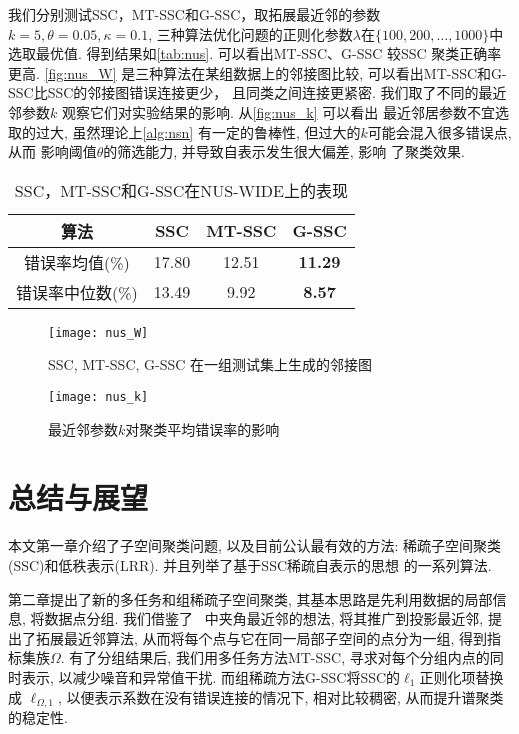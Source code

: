 我们分别测试SSC，MT-SSC和G-SSC，取拓展最近邻的参数
\(k=5,\theta=0.05, \kappa=0.1\),
三种算法优化问题的正则化参数\(\lambda\)在\(\{100, 200, \ldots, 1000\}\)中选取最优值.
得到结果如\autoref{tab:nus}.
可以看出MT-SSC、G-SSC 较SSC 聚类正确率更高.
\autoref{fig:nus_W} 是三种算法在某组数据上的邻接图比较,
可以看出MT-SSC和G-SSC比SSC的邻接图错误连接更少，
且同类之间连接更紧密. 我们取了不同的最近邻参数\(k\)
观察它们对实验结果的影响. 从\autoref{fig:nus_k} 可以看出
最近邻居参数不宜选取的过大, 虽然理论上\autoref{alg:nsn}
有一定的鲁棒性, 但过大的\(k\)可能会混入很多错误点, 从而
影响阈值\(\theta\)的筛选能力, 并导致自表示发生很大偏差, 影响
了聚类效果.
\begin{table}[htb]
  \centering
  \begin{tabular}{|c | c | c | c |}
	\hline
	  算法 & SSC & MT-SSC & G-SSC \\	\hline  \hline
      错误率均值(\%) & 17.80 & 12.51 & \textbf{11.29} \\	\hline
      错误率中位数(\%) & 13.49 & 9.92 & \textbf{8.57} \\	\hline
  \end{tabular}
  \caption{SSC，MT-SSC和G-SSC在NUS-WIDE上的表现}
  \label{tab:nus}
\end{table}

\begin{figure}[htb]
  \centering
  \texttt{[image: nus\_W]}
  \caption{SSC, MT-SSC, G-SSC 在一组测试集上生成的邻接图}
  \label{fig:nus_W}
\end{figure}
\begin{figure}[htb]
  \centering
  \texttt{[image: nus\_k]}
  \caption{最近邻参数\(k\)对聚类平均错误率的影响}
  \label{fig:nus_k}
\end{figure}

\section{总结与展望}
本文第一章介绍了子空间聚类问题, 以及目前公认最有效的方法:
稀疏子空间聚类(SSC)和低秩表示(LRR). 并且列举了基于SSC稀疏自表示的思想
的一系列算法.

第二章提出了新的多任务和组稀疏子空间聚类,
其基本思路是先利用数据的局部信息, 将数据点分组. 我们借鉴了~\cite{heckel2013noisy}
中夹角最近邻的想法, 将其推广到投影最近邻, 提出了拓展最近邻算法,
从而将每个点与它在同一局部子空间的点分为一组, 得到指标集族\(\Omega\).
有了分组结果后, 我们用多任务方法MT-SSC, 寻求对每个分组内点的同时表示,
以减少噪音和异常值干扰. 而组稀疏方法G-SSC将SSC的\(\ell_1\)正则化项替换成
\(\ell_{\Omega, 1}\), 以便表示系数在没有错误连接的情况下, 相对比较稠密,
从而提升谱聚类的稳定性.

